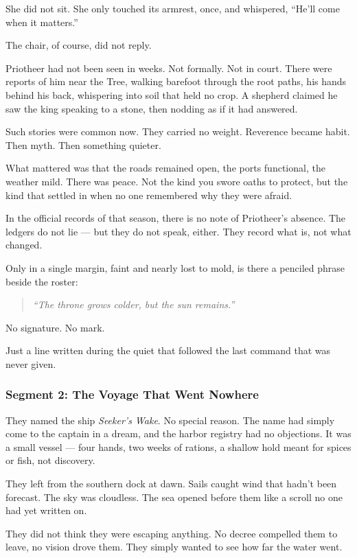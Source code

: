 \documentclass[9pt]{article}
\begin{document}
She did not sit. She only touched its armrest, once, and whispered, “He’ll come when it matters.”

The chair, of course, did not reply.

Priotheer had not been seen in weeks. Not formally. Not in court. There were reports of him near the Tree, walking barefoot through the root paths, his hands behind his back, whispering into soil that held no crop. A shepherd claimed he saw the king speaking to a stone, then nodding as if it had answered.

Such stories were common now. They carried no weight. Reverence became habit. Then myth. Then something quieter.

What mattered was that the roads remained open, the ports functional, the weather mild. There was peace. Not the kind you swore oaths to protect, but the kind that settled in when no one remembered why they were afraid.

In the official records of that season, there is no note of Priotheer’s absence. The ledgers do not lie — but they do not speak, either. They record what is, not what changed.

Only in a single margin, faint and nearly lost to mold, is there a penciled phrase beside the roster:

\begin{quote}
\emph{“The throne grows colder, but the sun remains.”}
\end{quote}

No signature. No mark.

Just a line written during the quiet that followed the last command that was never given.

\newpage

\subsubsection*{Segment 2: The Voyage That Went Nowhere}

They named the ship \emph{Seeker’s Wake}. No special reason. The name had simply come to the captain in a dream, and the harbor registry had no objections. It was a small vessel — four hands, two weeks of rations, a shallow hold meant for spices or fish, not discovery.

They left from the southern dock at dawn. Sails caught wind that hadn’t been forecast. The sky was cloudless. The sea opened before them like a scroll no one had yet written on.

They did not think they were escaping anything. No decree compelled them to leave, no vision drove them. They simply wanted to see how far the water went.
\end{document}

